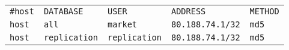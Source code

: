       \begin{table}[H]
        \label{pgHba}
          \begin{center}
            \begin{tabular}{lllll}
              \texttt{\#host} & \texttt{DATABASE} & \texttt{USER} & \texttt{ADDRESS} & \texttt{METHOD} \\
                \texttt{host} & \texttt{all} & \texttt{market} & \texttt{80.188.74.1/32} & \texttt{md5} \\
       \texttt{host} & \texttt{replication} & \texttt{replication} & \texttt{80.188.74.1/32} &	\texttt{md5} \\
            \end{tabular}
          \end{center}
      \end{table}




